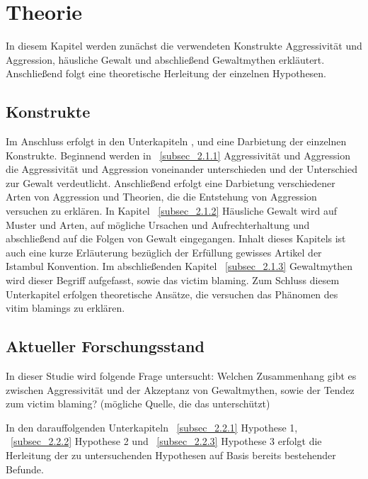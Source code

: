 

\chapter{Theorie}   \label{ch_2}
In diesem Kapitel werden zunächst die verwendeten Konstrukte Aggressivität und Aggression, häusliche Gewalt und abschließend Gewaltmythen erkläutert. Anschließend folgt eine theoretische Herleitung der einzelnen Hypothesen.

\section{Konstrukte}    \label{sec_2.1}
Im Anschluss erfolgt in den Unterkapiteln ,  und  eine Darbietung der einzelnen Konstrukte. Beginnend werden in ~\ref{subsec_2.1.1} Aggressivität und Aggression die Aggressivität und Aggression voneinander unterschieden und der Unterschied zur Gewalt verdeutlicht. Anschließend erfolgt eine Darbietung verschiedener Arten von Aggression und Theorien, die die Entstehung von Aggression versuchen zu erklären. In Kapitel ~\ref{subsec_2.1.2} Häusliche Gewalt wird auf Muster und Arten, auf mögliche Ursachen und Aufrechterhaltung und abschließend auf die Folgen von Gewalt eingegangen. Inhalt dieses Kapitels ist auch eine kurze Erläuterung bezüglich der Erfüllung gewisses Artikel der Istambul Konvention. Im abschließenden Kapitel ~\ref{subsec_2.1.3} Gewaltmythen wird dieser Begriff aufgefasst, sowie das victim blaming. Zum Schluss diesem Unterkapitel erfolgen theoretische Ansätze, die versuchen das Phänomen des vitim blamings zu erklären.





\section{Aktueller Forschungsstand}   \label{sec_2.2}
In dieser Studie wird folgende Frage untersucht: Welchen Zusammenhang gibt es zwischen Aggressivität und der Akzeptanz von Gewaltmythen, sowie der Tendez zum victim blaming? (mögliche Quelle, die das unterschützt) 

In den darauffolgenden Unterkapiteln ~\ref{subsec_2.2.1} Hypothese 1, ~\ref{subsec_2.2.2} Hypothese 2 und ~\ref{subsec_2.2.3} Hypothese 3 erfolgt die Herleitung der zu untersuchenden Hypothesen auf Basis bereits bestehender Befunde.



